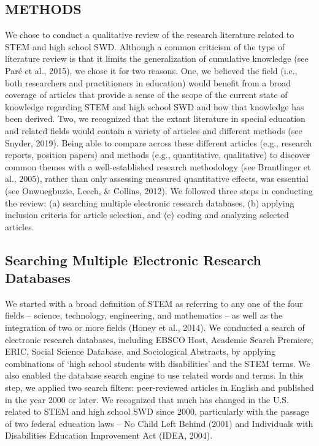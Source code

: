 \documentclass[11.5pt]{sig-alternate}
\begin{document}
\begin{large}
\section*{METHODS}
We chose to conduct a qualitative review of the research literature related to STEM and high school SWD. Although a common criticism of the type of literature review is that it limits the generalization of cumulative knowledge (see Paré et al., 2015), we chose it for two reasons. One, we believed the field (i.e., both researchers and practitioners in education) would benefit from a broad coverage of articles that provide a sense of the scope of the current state of knowledge regarding STEM and high school SWD and how that knowledge has been derived. Two, we recognized that the extant literature in special education and related fields would contain a variety of articles and different methods (see Snyder, 2019). Being able to compare across these different articles (e.g., research reports, position papers) and methods (e.g., quantitative, qualitative) to discover common themes with a well-established research methodology (see Brantlinger et al., 2005), rather than only assessing measured quantitative effects, was essential (see Onwuegbuzie, Leech, \& Collins, 2012). We followed three steps in conducting the review: (a) searching multiple electronic research databases, (b) applying inclusion criteria for article selection, and (c) coding and analyzing selected articles. 

\subsection*{Searching Multiple Electronic Research Databases}
We started with a broad definition of STEM as referring to any one of the four fields – science, technology, engineering, and mathematics – as well as the integration of two or more fields (Honey et al., 2014). We conducted a search of electronic research databases, including EBSCO Host, Academic Search Premiere, ERIC, Social Science Database, and Sociological Abstracts, by applying combinations of ‘high school students with disabilities’ and the STEM terms. We also enabled the database search engine to use related words and terms. In this step, we applied two search filters: peer-reviewed articles in English and published in the year 2000 or later. We recognized that much has changed in the U.S. related to STEM and high school SWD since 2000, particularly with the passage of two federal education laws – No Child Left Behind (2001) and Individuals with Disabilities Education Improvement Act (IDEA, 2004). 


\end{large}
\end{document}
